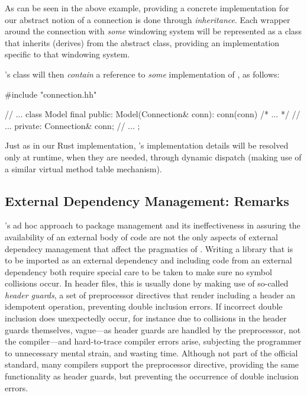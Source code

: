 As can be seen in the above example, providing a concrete implementation for
our abstract notion of a connection is done through \textit{inheritance}.
Each wrapper around the connection with \textit{some} windowing system will
be represented as a class that inherits (derives) from the 
abstract class, providing an implementation specific to that windowing system.

\wmcpp's  class will then \textit{contain} a reference to
\textit{some} implementation of , as follows:

\begin{cppblock}
  #include "connection.hh"
\end{cppblock}
\begin{cppblock}
  // ...
  class Model final
  {
  public:
    Model(Connection& conn): conn(conn) { /* ... */ }
    // ...
  private:
    Connection& conn;
    // ...
  };
\end{cppblock}

Just as in our Rust implementation, 's implementation details will
be resolved only at runtime, when they are needed, through dynamic dispatch
(making use of a similar virtual method table mechanism).


\subsection{External Dependency Management: Remarks}

\cpp's ad hoc approach to package management and its ineffectiveness in assuring
the availability of an external body of code are not the only aspects of
external dependecy management that affect the pragmatics of \cpp. Writing a
library that is to be imported as an external dependency and including code
from an external dependency both require special care to be taken to make sure
no symbol collisions occur. In header files, this is usually done by making
use of so-called \textit{header guards}, a set of preprocessor directives that
render including a header an idempotent operation, preventing double inclusion
errors. If incorrect double inclusion does unexpectedly occur, for instance
due to collisions in the header guards themselves, vague---as header guards
are handled by the preprocessor, not the compiler---and hard-to-trace compiler
errors arise, subjecting the programmer to unnecessary mental strain, and
wasting time. Although not part of the official standard\cite{cppstd}, many \cpp
compilers support the  preprocessor directive, providing the
same functionality as header guards, but preventing the occurrence of double
inclusion errors.

